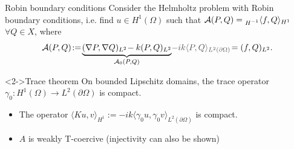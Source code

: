 \documentclass[]{beamer}
\newcommand{\oxarrow}{\color{oxfordblue}$\blacktriangleright$}
\begin{document}
	\begin{frame}{Robin boundary conditions}
	\vspace{0.8cm}
	Consider the Helmholtz problem with Robin boundary conditions, i.e. find $u \in H^1(\Omega)$ such that $\mathcal{A}(P,Q) = \prescript{}{H^{-1}}{\langle} f,Q \rangle_{H^1}$ $\forall Q \in X$, where
	\begin{equation*}
		\mathcal{A}(P,Q)\!:=\! \underbrace{(\nabla P, \nabla Q)_{L^2} \!- k (P,Q)_{L^2}}_{\mathcal{A}_0(P,Q)} {\color{gray!60!black} \!- ik \langle P, Q \rangle_{L^2(\partial \Omega)}}\! = (f , Q)_{L^2}.
	\end{equation*}
	\vspace{-0.5cm}
	\begin{block}<2->{Trace theorem}
		On bounded Lipschitz domains, the trace operator $\gamma_0 : H^1(\Omega) \to L^2(\partial \Omega)$ is compact. 
	\end{block}
	\begin{itemize}
		\item<3->[\oxarrow] The operator $\langle Ku, v \rangle_{H^1} := - i k \langle \gamma_0 u, \gamma_0 v \rangle_{L^2(\partial \Omega)}$ is compact. \\
		\item<4->[\oxarrow] $A$ is weakly T-coercive (injectivity can also be shown)
	\end{itemize}
	\end{frame}
	 
\end{document}
